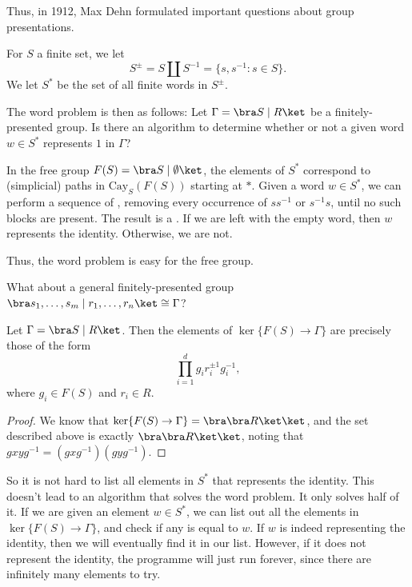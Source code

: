 \documentclass[a4paper]{article}
\newcommand\Cay{\mathrm{Cay}}
\begin{document}
Thus, in 1912, Max Dehn formulated important questions about group presentations.

For $S$ a finite set, we let
\[
  S^{\pm} = S \coprod S^{-1} = \{ s, s^{-1}: s \in S\}.
\]
We let $S^*$ be the set of all finite words in $S^{\pm}$.

The word problem is then as follows: Let $\Gamma = \bra S \mid R\ket$ be a finitely-presented group. Is there an algorithm to determine whether or not a given word $w \in S^*$ represents $1$ in $\Gamma$?

\begin{eg}
  In the free group $F(S) = \bra S \mid \emptyset\ket$, the elements of $S^*$ correspond to (simplicial) paths in $\Cay_S(F(S))$ starting at $*$. Given a word $w \in S^*$, we can perform a sequence of , removing every occurrence of $ss^{-1}$ or $s^{-1}s$, until no such blocks are present. The result is a . If we are left with the empty word, then $w$ represents the identity. Otherwise, we are not.
\end{eg}
Thus, the word problem is easy for the free group.

What about a general finitely-presented group $\bra s_1, \ldots, s_m \mid r_1, \ldots, r_n \ket \cong \Gamma$?

\begin{lemma}
  Let $\Gamma = \bra S \mid R\ket$. Then the elements of $\ker \{F(S) \to \Gamma\}$ are precisely those of the form
  \[
    \prod_{i = 1}^d g_i r_i^{\pm 1} g_i^{-1},
  \]
  where $g_i \in F(S)$ and $r_i \in R$.
\end{lemma}

\begin{proof}
  We know that $\ker \{F(S) \to \Gamma\} = \bra \bra R\ket \ket$, and the set described above is exactly $\bra \bra R\ket \ket$, noting that $gxyg^{-1} = (gxg^{-1})(gyg^{-1})$.
\end{proof}

So it is not hard to list all elements in $S^*$ that represents the identity. This doesn't lead to an algorithm that solves the word problem. It only solves half of it. If we are given an element $w \in S^*$, we can list out all the elements in $\ker \{F(S) \to \Gamma\}$, and check if any is equal to $w$. If $w$ is indeed representing the identity, then we will eventually find it in our list. However, if it does not represent the identity, the programme will just run forever, since there are infinitely many elements to try.
\end{document}
